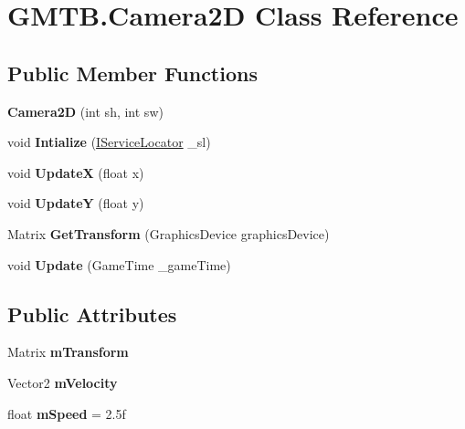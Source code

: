 \hypertarget{class_g_m_t_b_1_1_camera2_d}{}\section{G\+M\+T\+B.\+Camera2D Class Reference}
\label{class_g_m_t_b_1_1_camera2_d}
\subsection*{Public Member Functions}
\begin{DoxyCompactItemize}
\item 
\mbox{\label{class_g_m_t_b_1_1_camera2_d_a6c3afd6f5e02bd339966aaa110d90725}} 
{\bfseries Camera2D} (int sh, int sw)
\item 
\mbox{\label{class_g_m_t_b_1_1_camera2_d_a073babc8f4b0e0db267251ca8d6cbc14}} 
void {\bfseries Intialize} (\mbox{\hyperlink{interface_g_m_t_b_1_1_interfaces_1_1_i_service_locator}{I\+Service\+Locator}} \+\_\+sl)
\item 
\mbox{\label{class_g_m_t_b_1_1_camera2_d_a4c3924e504759905923585f86b3de6b4}} 
void {\bfseries UpdateX} (float x)
\item 
\mbox{\label{class_g_m_t_b_1_1_camera2_d_a482b5fee379c53a7eef8c5c79bea53b8}} 
void {\bfseries UpdateY} (float y)
\item 
\mbox{\label{class_g_m_t_b_1_1_camera2_d_a8d3dbc4443fbb9165525bdc79c634dea}} 
Matrix {\bfseries Get\+Transform} (Graphics\+Device graphics\+Device)
\item 
\mbox{\label{class_g_m_t_b_1_1_camera2_d_a227685c69d823ba37730d97bec7bf273}} 
void {\bfseries Update} (Game\+Time \+\_\+game\+Time)
\end{DoxyCompactItemize}
\subsection*{Public Attributes}
\begin{DoxyCompactItemize}
\item 
\mbox{\label{class_g_m_t_b_1_1_camera2_d_a76af17e69db460cb7c6234712fae500e}} 
Matrix {\bfseries m\+Transform}
\item 
\mbox{\label{class_g_m_t_b_1_1_camera2_d_a577f7914cb730455ea157b24dab642ef}} 
Vector2 {\bfseries m\+Velocity}
\item 
\mbox{\label{class_g_m_t_b_1_1_camera2_d_a7b4c49d07c933ed85c77a31f323936a8}} 
float {\bfseries m\+Speed} = 2.\+5f
\end{DoxyCompactItemize}

